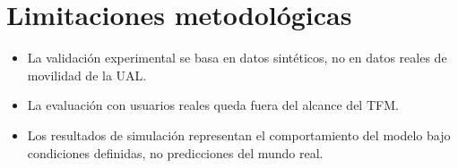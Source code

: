 \section{Limitaciones metodológicas}

\begin{itemize}
    \item La validación experimental se basa en datos sintéticos, no en datos reales de movilidad de la UAL.
    \item La evaluación con usuarios reales queda fuera del alcance del TFM.
    \item Los resultados de simulación representan el comportamiento del modelo bajo condiciones definidas, no predicciones del mundo real.
\end{itemize}
